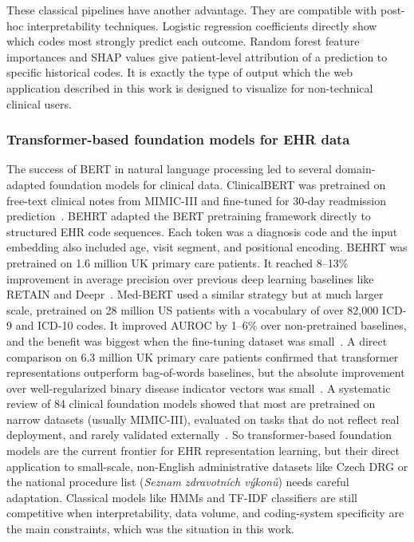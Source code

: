 These classical pipelines have another advantage. They are compatible with post-hoc interpretability techniques. Logistic regression coefficients directly show which codes most strongly predict each outcome. Random forest feature importances and SHAP values give patient-level attribution of a prediction to specific historical codes. It is exactly the type of output which the web application described in this work is designed to visualize for non-technical clinical users.

\subsubsection{Transformer-based foundation models for EHR data}
\label{subsec:foundation_models_ehr}

The success of BERT in natural language processing led to several domain-adapted foundation models for clinical data. ClinicalBERT was pretrained on free-text clinical notes from MIMIC-III and fine-tuned for 30-day readmission prediction~\cite{huang2019clinicalbert}. BEHRT adapted the BERT pretraining framework directly to structured EHR code sequences. Each token was a diagnosis code and the input embedding also included age, visit segment, and positional encoding. BEHRT was pretrained on 1.6 million UK primary care patients. It reached 8--13\% improvement in average precision over previous deep learning baselines like RETAIN and Deepr~\cite{li2020behrt}. Med-BERT used a similar strategy but at much larger scale, pretrained on 28 million US patients with a vocabulary of over 82,000 ICD-9 and ICD-10 codes. It improved AUROC by 1--6\% over non-pretrained baselines, and the benefit was biggest when the fine-tuning dataset was small~\cite{rasmy2021medbert}. A direct comparison on 6.3 million UK primary care patients confirmed that transformer representations outperform bag-of-words baselines, but the absolute improvement over well-regularized binary disease indicator vectors was small~\cite{beaney2024comparing}. A systematic review of 84 clinical foundation models showed that most are pretrained on narrow datasets (usually MIMIC-III), evaluated on tasks that do not reflect real deployment, and rarely validated externally~\cite{wornow2023shaky}. So transformer-based foundation models are the current frontier for EHR representation learning, but their direct application to small-scale, non-English administrative datasets like Czech DRG or the national procedure list (\textit{Seznam zdravotních výkonů}) needs careful adaptation. Classical models like HMMs and TF-IDF classifiers are still competitive when interpretability, data volume, and coding-system specificity are the main constraints, which was the situation in this work.

